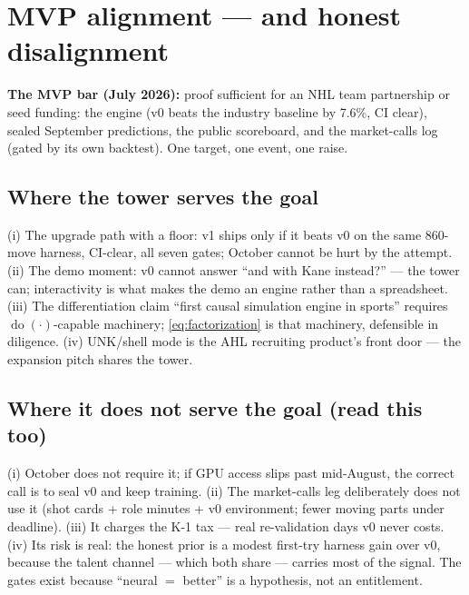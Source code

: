 \documentclass[11pt]{article}
\newcommand{\dodo}[1]{\ensuremath{\operatorname{do}(#1)}}
\begin{document}
\section{MVP alignment --- and honest disalignment}
\textbf{The MVP bar (July 2026):} proof sufficient for an NHL team partnership
or seed funding: the engine (v0 beats the industry baseline by 7.6\%, CI clear),
sealed September predictions, the public scoreboard, and the market-calls log
(gated by its own backtest). One target, one event, one raise.

\subsection*{Where the tower serves the goal}
(i) The upgrade path with a floor: v1 ships only if it beats v0 on the same
860-move harness, CI-clear, all seven gates; October cannot be hurt by the
attempt. (ii) The demo moment: v0 cannot answer ``and with Kane instead?'' ---
the tower can; interactivity is what makes the demo an engine rather than a
spreadsheet. (iii) The differentiation claim ``first causal simulation engine
in sports'' requires \dodo{\cdot}-capable machinery; \eqref{eq:factorization}
is that machinery, defensible in diligence. (iv) UNK/shell mode is the AHL
recruiting product's front door --- the expansion pitch shares the tower.

\subsection*{Where it does not serve the goal (read this too)}
(i) October does not require it; if GPU access slips past mid-August, the
correct call is to seal v0 and keep training. (ii) The market-calls leg
deliberately does not use it (shot cards + role minutes + v0 environment;
fewer moving parts under deadline). (iii) It charges the K-1 tax --- real
re-validation days v0 never costs. (iv) Its risk is real: the honest prior is
a modest first-try harness gain over v0, because the talent channel --- which
both share --- carries most of the signal. The gates exist because
``neural $=$ better'' is a hypothesis, not an entitlement.
\end{document}
